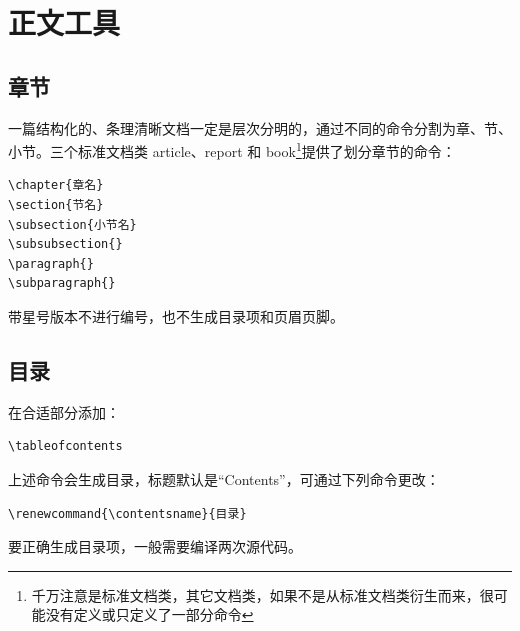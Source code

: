 \chapter{正文工具}\label{chap:text}
\section{章节}\label{sec:section}

一篇结构化的、条理清晰文档一定是层次分明的，通过不同的命令分割为章、节、小节。三个标准文档类 article、report 和 book\footnote{千万注意是标准文档类，其它文档类，如果不是从标准文档类衍生而来，很可能没有定义或只定义了一部分命令}提供了划分章节的命令：
\begin{lstlisting}
\chapter{章名}
\section{节名}
\subsection{小节名}
\subsubsection{}
\paragraph{}
\subparagraph{}
\end{lstlisting}

带星号版本不进行编号，也不生成目录项和页眉页脚。

\section{目录}\label{sec:toc}

在合适部分添加：
\begin{lstlisting}
\tableofcontents
\end{lstlisting}

上述命令会生成目录，标题默认是“Contents”，可通过下列命令更改：
\begin{lstlisting}
\renewcommand{\contentsname}{目录}
\end{lstlisting}

要正确生成目录项，一般需要编译两次源代码。

